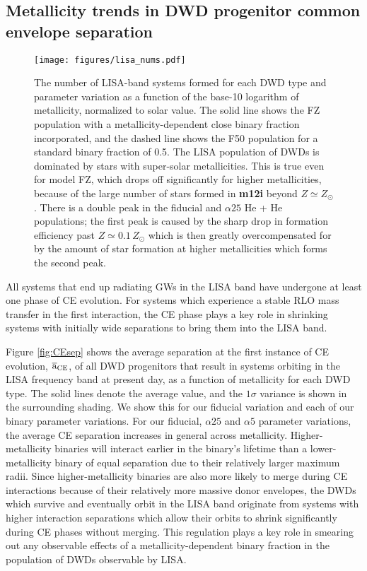\documentclass[twocolumn]{aastex631}
\begin{document}
\subsection{Metallicity trends in DWD progenitor common envelope separation}\label{sec:CEsep}

\begin{figure*}
	\texttt{[image: figures/lisa\_nums.pdf]}
    \caption{The number of LISA-band systems formed for each DWD type and parameter variation as a function of the base-10 logarithm of metallicity, normalized to solar value. The solid line shows the FZ population with a metallicity-dependent close binary fraction incorporated, and the dashed line shows the F50 population for a standard binary fraction of 0.5. The LISA population of DWDs is dominated by stars with super-solar metallicities. This is true even for model FZ, which drops off significantly for higher metallicities, because of the large number of stars formed in \textbf{m12i} beyond $Z\simeq Z_\odot$. There is a double peak in the fiducial and $\alpha25$ He + He populations; the first peak is caused by the sharp drop in formation efficiency past $Z\simeq0.1\,Z_\odot$ which is then greatly overcompensated for by the amount of star formation at higher metallicities which forms the second peak.}
    \label{fig:lisa_nums}
\end{figure*}

All systems that end up radiating GWs in the LISA band have undergone at least one phase of CE evolution. For systems which experience a stable RLO mass transfer in the first interaction, the CE phase plays a key role in shrinking systems with initially wide separations to bring them into the LISA band. 

Figure \ref{fig:CEsep} shows the average separation at the first instance of CE evolution, $\overline{\mathrm{a}}_{\rm{CE}}$, of all DWD progenitors that result in systems orbiting in the LISA frequency band at present day, as a function of metallicity for each DWD type. The solid lines denote the average value, and the $1\sigma$ variance is shown in the surrounding shading. We show this for our fiducial variation and each of our binary parameter variations. For our fiducial, $\alpha25$ and $\alpha5$ parameter variations, the average CE separation increases in general across metallicity. Higher-metallicity binaries will interact earlier in the binary's lifetime than a lower-metallicity binary of equal separation due to their relatively larger maximum radii. Since higher-metallicity binaries are also more likely to merge during CE interactions because of their relatively more massive donor envelopes, the DWDs which survive and eventually orbit in the LISA band originate from systems with higher interaction separations which allow their orbits to shrink significantly during CE phases without merging. This regulation plays a key role in smearing out any observable effects of a metallicity-dependent binary fraction in the population of DWDs observable by LISA. 
\end{document}
